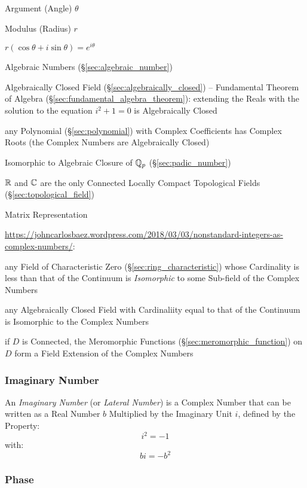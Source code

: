 Argument (Angle) $\theta$

Modulus (Radius) $r$

$r(\cos\theta + i \sin\theta) = e^{i\theta}$

Algebraic Numbers (\S\ref{sec:algebraic_number})

Algebraically Closed Field (\S\ref{sec:algebraically_closed}) -- Fundamental
Theorem of Algebra (\S\ref{sec:fundamental_algebra_theorem}): extending the
Reals with the solution to the equation $i^2 + 1 = 0$ is Algebraically Closed

any Polynomial (\S\ref{sec:polynomial}) with Complex Coefficients has Complex
Roots (the Complex Numbers are Algebraically Closed)

Isomorphic to Algebraic Closure of $\mathbb{Q}_p$ (\S\ref{sec:padic_number})

$\mathbb{R}$ and $\mathbb{C}$ are the only Connected Locally Compact
Topological Fields (\S\ref{sec:topological_field})

Matrix Representation %

\url{https://johncarlosbaez.wordpress.com/2018/03/03/nonstandard-integers-as-complex-numbers/}:

any Field of Characteristic Zero (\S\ref{sec:ring_characteristic}) whose
Cardinality is less than that of the Continuum is \emph{Isomorphic} to some
Sub-field of the Complex Numbers

any Algebraically Closed Field with Cardinaliity equal to that of the Continuum
is Isomorphic to the Complex Numbers

if $D$ is Connected, the Meromorphic Functions
(\S\ref{sec:meromorphic_function}) on $D$ form a Field Extension of the Complex
Numbers



\subsubsection{Imaginary Number}\label{sec:imaginary_number}

An \emph{Imaginary Number} (or \emph{Lateral Number}) is a Complex Number that
can be written as a Real Number $b$ Multiplied by the Imaginary Unit $i$,
defined by the Property:
\[
  i^2 = -1
\]
with:
\[
  bi = -b^2
\]



\subsubsection{Phase}\label{sec:phase}

